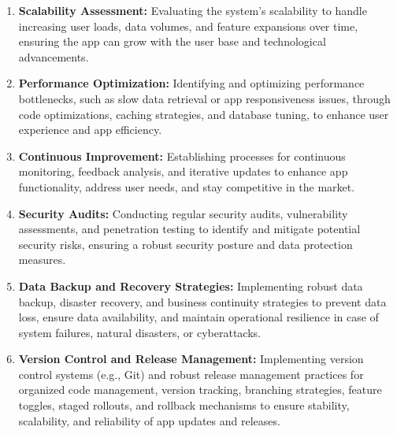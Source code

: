 \begin{enumerate}
    \item \textbf{Scalability Assessment:} Evaluating the system's scalability to handle increasing user loads, data volumes, and feature expansions over time, ensuring the app can grow with the user base and technological advancements.
    
    \item \textbf{Performance Optimization:} Identifying and optimizing performance bottlenecks, such as slow data retrieval or app responsiveness issues, through code optimizations, caching strategies, and database tuning, to enhance user experience and app efficiency.

    \item \textbf{Continuous Improvement:} Establishing processes for continuous monitoring, feedback analysis, and iterative updates to enhance app functionality, address user needs, and stay competitive in the market.
    
    \item \textbf{Security Audits:} Conducting regular security audits, vulnerability assessments, and penetration testing to identify and mitigate potential security risks, ensuring a robust security posture and data protection measures.
    
    \item \textbf{Data Backup and Recovery Strategies:} Implementing robust data backup, disaster recovery, and business continuity strategies to prevent data loss, ensure data availability, and maintain operational resilience in case of system failures, natural disasters, or cyberattacks.
    
    \item \textbf{Version Control and Release Management:} Implementing version control systems (e.g., Git) and robust release management practices for organized code management, version tracking, branching strategies, feature toggles, staged rollouts, and rollback mechanisms to ensure stability, scalability, and reliability of app updates and releases.    
\end{enumerate}



